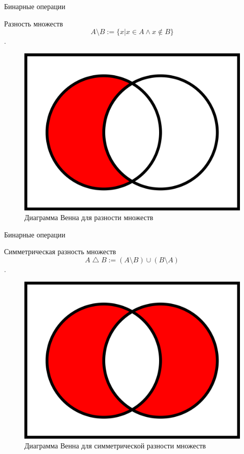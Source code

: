 \documentclass{beamer}
\begin{document}
\begin{frame}{Бинарные операции}
\begin{block}{Разность множеств}
\[A \setminus B := \{ x|x \in A \wedge x \notin B \}\].
\end{block}
\begin{figure}[h]
\centering
\includegraphics[scale=0.1]{images/sub.png}
\caption{Диаграмма Венна для разности множеств}
\label{pic-union}
\end{figure}
\end{frame}

\begin{frame}{Бинарные операции}
\begin{block}{Симметрическая разность множеств}
\[A \bigtriangleup B := (A \setminus B)\cup(B\setminus A)\].
\end{block}
\begin{figure}[h]
\centering
\includegraphics[scale=0.1]{images/xor.png}
\caption{Диаграмма Венна для симметрической разности множеств}
\label{pic-union}
\end{figure}
\end{frame}
\end{document}
